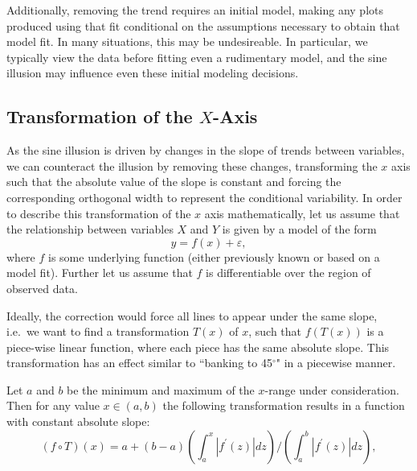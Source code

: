 \documentclass[11pt]{isuthesis}\usepackage[]{graphicx}\usepackage[]{color}
\begin{document}
Additionally, removing the trend requires an initial model, making any plots produced using that fit conditional on the assumptions necessary to obtain that model fit. In many situations, this may be undesireable. In particular, we typically view the data before fitting even a rudimentary model, and the sine illusion may influence even these initial modeling decisions.

\subsection{Transformation of the $X$-Axis}
As the sine illusion is driven by changes in the slope of trends between variables, we can counteract the illusion by removing these changes, transforming the $x$ axis such that the absolute value of the slope is constant and forcing the corresponding orthogonal width to represent the conditional variability.
In order to describe this transformation of the $x$ axis mathematically, 
let us assume that the relationship between variables $X$ and $Y$ is given by a  model of the form 
\[
y = f(x) + \varepsilon,
\]
where $f$ is some underlying function (either previously known or based on a model fit). Further let us assume that  $f$ is differentiable over the region of observed data.

Ideally, the correction would force all lines to appear under the same slope, i.e.~we want to find a transformation $T(x)$ of $x$, such that $f(T(x))$ is a  piece-wise linear function, where each piece has the same absolute slope. This transformation has an effect similar to ``banking to 45$^\circ$" in a piecewise manner. 

Let $a$ and $b$ be the minimum and maximum of the $x$-range under consideration. Then for any value $x \in (a,b)$ the following transformation results in a function with constant absolute slope:
\begin{equation}\label{eqn.xtrans}
(f \circ T)(x) = a + (b-a)\left(\int_{a}^x |f^\prime(z)| dz\right)/\left(\int_{a}^{b}|f^\prime(z)| dz\right),
\end{equation}
\end{document}

